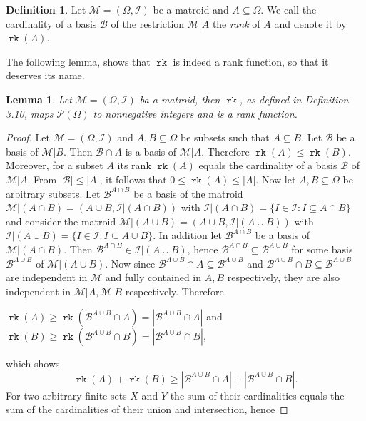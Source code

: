 \documentclass[12pt,a4paper, twoside, autooneside=false]{scrartcl}
\newtheorem{lemma}[theorem]{Lemma}
\theoremstyle{definition}
\newtheorem{definition}[theorem]{Definition}
\theoremstyle{remark}
\numberwithin{equation}{section}
\DeclareMathOperator{\rk}{\mathtt{rk}}
\newcommand{\M}{\mathcal{M}} %
\begin{document}
\begin{definition}
Let $\M = (\Omega, \mathcal{I})$ be a matroid and $A \subseteq \Omega$. We call the cardinality of a basis $\mathcal{B}$ of the restriction $\M|A$ the \textit{rank} of $A$ and denote it by $\rk(A)$. 
\end{definition}
The following lemma, shows that $\rk$ is indeed a rank function, so that it deserves its name.
\begin{lemma}
Let $\M = (\Omega, \mathcal{I})$ ba a matroid, then $\rk$, as defined in Definition 3.10, maps $\mathcal{P}(\Omega)$ to nonnegative integers and is a rank function.
\end{lemma}
\begin{proof}
Let $\M = (\Omega, \mathcal{I})$ and $A,B \subseteq \Omega$ be subsets such that $A \subseteq B$. Let $\mathcal{B}$ be a basis of $\M|B$. Then $\mathcal{B} \cap A$ is a basis of $\M|A$. Therefore $\rk(A) \leq \rk(B)$. Moreover, for a subset $A$ its rank $\rk(A)$ equals the cardinality of a basis $\mathcal{B}$ of $\M|A$. From $|\mathcal{B}| \leq |A|$, it follows that $0 \leq \rk(A) \leq |A|$. 
\noindent
Now let $A,B \subseteq \Omega$ be arbitrary subsets. Let $\mathcal{B}^{A \cap B}$ be a basis of the matroid $\M{|{(A \cap B)}} = (A \cup B, \mathcal{I}|(A \cap B))$ with $\mathcal{I}|{(A \cap B)} = \{I \in \mathcal{I}: I \subseteq A \cap B\}$ and consider the matroid $\M{|{(A \cup B)}} = (A \cup B, \mathcal{I}|{(A \cup B)})$ with $\mathcal{I}|{(A \cup B)} = \{ I \in \mathcal{I}: I \subseteq A \cup B\}$. In addition let $\mathcal{B}^{A \cap B}$ be a basis of $\M{|{(A \cap B)}}$. Then $\mathcal{B}^{A \cap B} \in \mathcal{I}|{(A \cup B)}$, hence $\mathcal{B}^{A \cap B} \subseteq \mathcal{B}^{A \cup B}$ for some basis $\mathcal{B}^{A \cup B}$ of $\M{|{(A \cup B)}}$. Now since $\mathcal{B}^{A \cup B} \cap A \subseteq \mathcal{B}^{A \cup B}$ and $\mathcal{B}^{A \cup B} \cap B \subseteq \mathcal{B}^{A \cup B}$ are independent in $\M$ and fully contained in $A,B$ respectively, they are also independent in $\M{|{A}}, \M{|{B}}$ respectively. Therefore \begin{center} $\rk(A) \geq \rk(\mathcal{B}^{A \cup B}\cap A) =  |\mathcal{B}^{A \cup B} \cap A|$ and $\rk(B) \geq \rk(\mathcal{B}^{A \cup B} \cap B) = |\mathcal{B}^{A \cup B}\cap B|$,\end{center}which shows
\[
\rk(A) + \rk(B) \geq |\mathcal{B}^{A \cup B} \cap A| + |\mathcal{B}^{A \cup B} \cap B|.
\]
For two arbitrary finite sets $X$ and $Y$ the sum of their cardinalities equals the sum of the cardinalities of their union and intersection, hence 

\end{proof}
\end{document}
